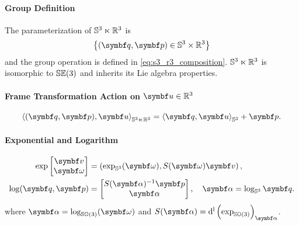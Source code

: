 \begin{properties}[breakable, title={$\Sthree \ltimes \mathbb{R}^3$ formula sheet}]
  \paragraph{Group Definition}
  The parameterization of $\Sthree \ltimes \mathbb{R}^3$ is
  \begin{equation}
    \left\{ (\bq, \bp) \in \Sthree \times \mathbb{R}^3 \right\}
  \end{equation}
  and the group operation is defined in \eqref{eq:s3_r3_composition}. $\Sthree \ltimes \mathbb{R}^3$ is isomorphic to ${\mathbb{SE}(3)}$ and inherits its Lie algebra properties.

  \paragraph{Frame Transformation Action on $\bu \in \mathbb{R}^{3}$}
  \begin{equation}
    \left\langle (\bq, \bp), \bu \right \rangle_{\Sthree \ltimes \mathbb{R}^3} = \left \langle \bq, \bu \right \rangle_\Sthree + \bp.
  \end{equation}

  \paragraph{Exponential and Logarithm}
  \begin{subequations}
    \label{eq:s3r3_exp_log}
    \begin{align}
      \label{eq:s3r3_exp}
      \exp \begin{bmatrix} \bv \\ \bomega \end{bmatrix} & = \left(\exp_\Sthree(\bomega), S(\bomega) \bv\right),      \\
      \label{eq:s3r3_log}
      \log (\bq, \bp)                   & = \begin{bmatrix} S(\symbf \alpha)^{-1} \bp \\ \symbf \alpha \end{bmatrix}, \quad \symbf \alpha = \log_\Sthree \bq.
    \end{align}
  \end{subequations}
  where $\symbf \alpha = \log_\SOthree(\bomega)$ and $S(\symbf \alpha) = \dl \left( \exp_\SOthree \right)_{\symbf \alpha}$.
\end{properties}


